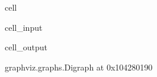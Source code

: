 \documentclass[letterpaper,10pt,english]{jupyterBook}
\begin{document}
\begin{sphinxuseclass}{cell}
\begin{sphinxVerbatimInput}
\begin{sphinxuseclass}{cell_input}
\end{sphinxuseclass}\end{sphinxVerbatimInput}
\begin{sphinxVerbatimOutput}

\begin{sphinxuseclass}{cell_output}
\begin{sphinxVerbatim}[commandchars=\\\{\}]
\PYGZlt{}graphviz.graphs.Digraph at 0x104280190\PYGZgt{}
\end{sphinxVerbatim}

\end{sphinxuseclass}\end{sphinxVerbatimOutput}

\end{sphinxuseclass}
\sphinxAtStartPar
{}
\end{document}
